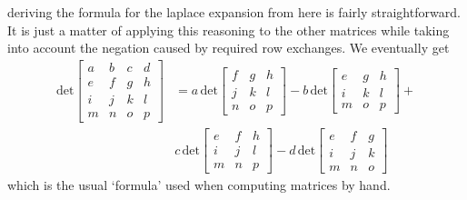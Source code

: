 \documentclass{report}
\begin{document}
deriving the formula for the laplace expansion from here is fairly straightforward. It is just a matter of applying this reasoning to the other matrices while taking into 
account the negation caused by required row exchanges. We eventually get
\begin{align*}
\text{det}\left[\begin{array}{cccc}
a&b&c&d\\
e&f&g&h\\
i&j&k&l\\
m&n&o&p
\end{array}\right]&=a\,\text{det}\left[\begin{array}{ccc}
f&g&h\\
j&k&l\\
n&o&p
\end{array}\right]-
b\,\text{det}\left[\begin{array}{ccc}
e&g&h\\
i&k&l\\
m&o&p
\end{array}\right]+\\
&c\,\text{det}\left[\begin{array}{ccc}
e&f&h\\
i&j&l\\
m&n&p
\end{array}\right]-
d\,\text{det}\left[\begin{array}{ccc}
e&f&g\\
i&j&k\\
m&n&o
\end{array}\right]
\end{align*}
which is the usual `formula' used when computing matrices by hand.
\newpage
\end{document}
